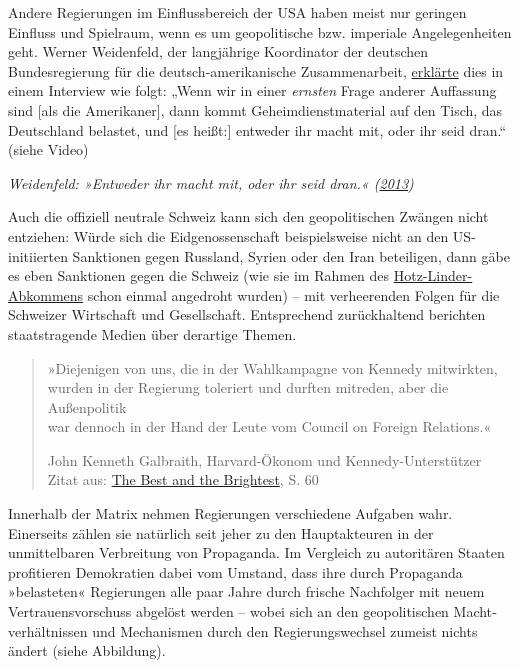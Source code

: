 Andere Regierungen im Einflussbereich der USA haben meist nur geringen
Einfluss und Spielraum, wenn es um geopolitische bzw. imperiale
Angelegenheiten geht. Werner Weidenfeld, der langjährige Koordinator der
deutschen Bundesregierung für die deutsch-amerikanische Zusammenarbeit,
\href{https://swprs.org/video-werner-weidenfeld/}{erklärte} dies in
einem Interview wie folgt: „Wenn wir in einer \emph{ernsten} Frage
anderer Auffassung sind {[}als die Amerikaner{]}, dann kommt
Geheim­dienst­material auf den Tisch, das Deutschland belastet, und
{[}es heißt:{]} entweder ihr macht mit, oder ihr seid dran.`` (siehe
Video)

\emph{Weidenfeld: »Entweder ihr macht mit, oder ihr seid dran.«
(\href{https://swprs.org/video-werner-weidenfeld/}{2013})}

Auch die offiziell neutrale Schweiz kann sich den geopolitischen Zwängen
nicht entziehen: Würde sich die Eidgenossen­schaft beispielsweise nicht
an den US-initiierten Sanktionen gegen Russland, Syrien oder den Iran
beteiligen, dann gäbe es eben Sanktionen gegen die Schweiz (wie sie im
Rahmen des
\href{https://de.wikipedia.org/wiki/Hotz-Linder-Agreement}{Hotz-Linder-Abkommens}
schon einmal angedroht wurden) -- mit verheerenden Folgen für die
Schweizer Wirtschaft und Gesellschaft. Entsprechend zurück­haltend
berichten staats­tragende Medien über derartige Themen.

\begin{quote}
»Diejenigen von uns, die in der Wahlkampagne von Kennedy mitwirkten,\\
wurden in der Regierung toleriert und durften mitreden, aber die
Außenpolitik\\
war dennoch in der Hand der Leute vom Council on Foreign Relations.«

John Kenneth Galbraith, Harvard-Ökonom und Kennedy-Unterstützer\\
Zitat aus:
\href{https://books.google.com/books?id=U_WoXcJq_1wC\&q=\%22council+on+foreign+relations+people\%22}{The
Best and the Brightest}, S. 60
\end{quote}

Innerhalb der Matrix nehmen Regierungen verschiedene Aufgaben wahr.
Einerseits zählen sie natürlich seit jeher zu den Hauptakteuren in der
unmittelbaren Verbreitung von Propaganda. Im Vergleich zu autoritären
Staaten profitieren Demokratien dabei vom Umstand, dass ihre durch
Propaganda »belasteten« Regierungen alle paar Jahre durch frische
Nachfolger mit neuem Vertrauens­vorschuss abgelöst werden -- wobei sich
an den geopolitischen Macht­ver­hältnissen und Mechanismen durch den
Regierungs­wechsel zumeist nichts ändert (siehe Abbildung).

